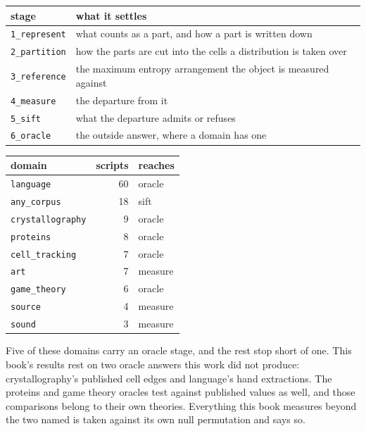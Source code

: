 \begin{center}
\begin{tabular}{@{}>{\raggedright\arraybackslash}p{}>{\raggedright\arraybackslash}p{}@{}}
\toprule
stage & what it settles \\
\midrule
\texttt{1\_represent} & what counts as a part, and how a part is written down \\
\texttt{2\_partition}  & how the parts are cut into the cells a distribution is taken over \\
\texttt{3\_reference}  & the maximum entropy arrangement the object is measured against \\
\texttt{4\_measure}    & the departure from it \\
\texttt{5\_sift}       & what the departure admits or refuses \\
\texttt{6\_oracle}     & the outside answer, where a domain has one \\
\bottomrule
\end{tabular}
\end{center}

\begin{center}
\begin{tabular}{@{}>{\raggedright\arraybackslash}p{}rl@{}}
\toprule
domain & scripts & reaches \\
\midrule
\texttt{language}        & 60 & oracle \\
\texttt{any\_corpus}     & 18 & sift \\
\texttt{crystallography} &  9 & oracle \\
\texttt{proteins}        &  8 & oracle \\
\texttt{cell\_tracking}  &  7 & oracle \\
\texttt{art}             &  7 & measure \\
\texttt{game\_theory}    &  6 & oracle \\
\texttt{source}          &  4 & measure \\
\texttt{sound}           &  3 & measure \\
\bottomrule
\end{tabular}
\end{center}

Five of these domains carry an oracle stage, and the rest stop short of one. This book's results
rest on two oracle answers this work did not produce: crystallography's published cell edges and
language's hand extractions. The proteins and game theory oracles test against published values as
well, and those comparisons belong to their own theories. Everything this book measures beyond the
two named is taken against its own null permutation and says so.

